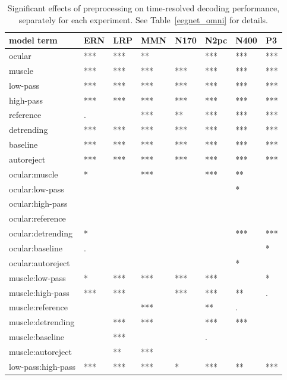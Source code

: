 \begin{table}[!htp]
\begin{widestuff}
\caption{Significant effects of preprocessing on time-resolved decoding performance, separately for each experiment. See Table~\ref{eegnet_omni} for details.} 
\label{sliding_omni}
\begin{tabular}{llllllll}
  \hline
model term & ERN & LRP & MMN & N170 & N2pc & N400 & P3 \\ 
  \hline
ocular & *** & *** & ** &   & *** & *** & *** \\ 
  muscle & *** & *** & *** & *** & *** & *** & *** \\ 
  low-pass & *** & *** & *** & *** & *** & *** & *** \\ 
  high-pass & *** & *** & *** & *** & *** & *** & *** \\ 
  reference & . &   & *** & ** & *** & *** & *** \\ 
  detrending & *** & *** & *** & *** & *** & *** & *** \\ 
  baseline & *** & *** & *** & *** & *** & *** & *** \\ 
  autoreject & *** & *** & *** & *** & *** & *** & *** \\ 
  ocular:muscle & * &   & *** &   & *** & ** &   \\ 
  ocular:low-pass &   &   &   &   &   & * &   \\ 
  ocular:high-pass &   &   &   &   &   &   &   \\ 
  ocular:reference &   &   &   &   &   &   &   \\ 
  ocular:detrending & * &   &   &   &   & *** & *** \\ 
  ocular:baseline & . &   &   &   &   &   & * \\ 
  ocular:autoreject &   &   &   &   &   & * &   \\ 
  muscle:low-pass & * & *** & *** & *** & *** &   & * \\ 
  muscle:high-pass & *** & *** &   & *** & *** & ** & . \\ 
  muscle:reference &   &   & *** &   & ** & . &   \\ 
  muscle:detrending &   & *** & *** &   & *** & *** &   \\ 
  muscle:baseline &   & *** &   &   & . &   &   \\ 
  muscle:autoreject &   & ** & *** &   &   &   &   \\ 
  low-pass:high-pass & *** & *** & *** & * & *** & ** & *** \\ 

\end{tabular}
\end{widestuff}
\end{table}
